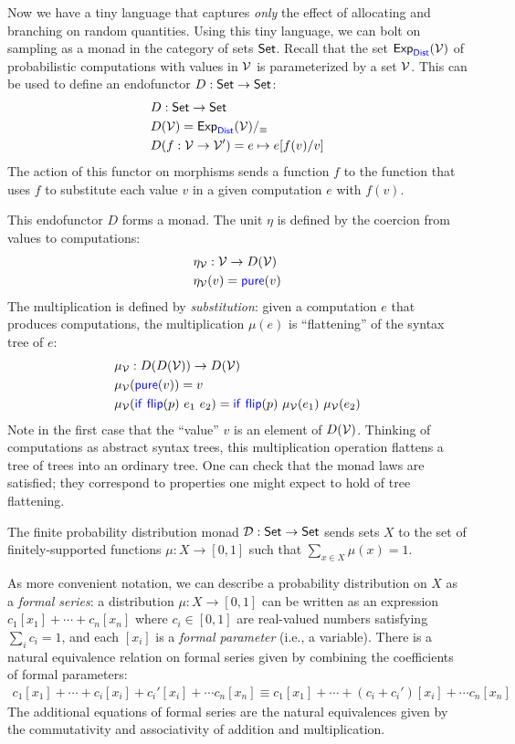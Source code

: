 Now we have a tiny language that captures \emph{only} the effect of allocating 
and branching on random quantities. Using this tiny language, we can bolt on sampling
as a monad in the category of sets $\mathsf{Set}$.
Recall that the set $\mathsf{Exp}_{\mathsf{{\color{blue}Dist}}}(\mathcal V)$ of probabilistic computations
with values in \(\mathcal V\) is parameterized by a set \(\mathcal V\).
This can be used to define an endofunctor \(D : \mathsf{Set} \to \mathsf{Set}\):
\begin{align*}
  &D : \mathsf{Set} \to \mathsf{Set} \\
  &D(\mathcal V) = \mathsf{Exp}_{\mathsf{{\color{blue}Dist}}}(\mathcal V) /_\equiv \\
  &D(f : \mathcal V \to \mathcal V') = e \mapsto e[f(v)/v]
\end{align*}
The action of this functor on morphisms sends a function \(f\)
to the function that uses \(f\) to substitute each value \(v\) in a given computation \(e\)
with \(f(v)\).

This endofunctor \(D\) forms a monad. The unit \(\eta\) is defined by
the coercion from values to computations:
\begin{align*}
  &\eta_{\mathcal V} : \mathcal V \to D(\mathcal V) \\
  &\eta_{\mathcal V}(v) = \mathsf{{\color{blue}pure}}(v)
\end{align*}
The multiplication is defined by \emph{substitution}:
given a computation \(e\) that produces computations,
the multiplication \(\mu(e)\) is ``flattening'' of the syntax tree of \(e\):
\begin{align*}
  &\mu_{\mathcal V} : D(D(\mathcal V)) \to D(\mathcal V) \\
  &\mu_{\mathcal V}(\mathsf{{\color{blue}pure}}(v)) = v \\
  &\mu_{\mathcal V}(\mathsf{{\color{blue}if}}~\mathsf{{\color{blue}flip}}{}(p)~{e_1}~{e_2}) = \mathsf{{\color{blue}if}}~\mathsf{{\color{blue}flip}}{}(p)~{\mu_{\mathcal V}(e_1)}~{\mu_{\mathcal V}(e_2)} \\
\end{align*}
Note in the first case that the ``value'' \(v\) is an element of \(D(\mathcal V)\).
Thinking of computations as abstract syntax trees, this multiplication operation
flattens a tree of trees into an ordinary tree.
One can check that the monad laws are satisfied;
they correspond to properties one might expect to hold of tree flattening.

The finite
probability distribution monad $\mathcal D : \mathsf{Set} \to \mathsf{Set}$ sends sets $X$ to 
the set of finitely-supported functions $\mu : X \to [0,1]$ such that 
$\sum_{x \in X} \mu(x) = 1$.

As more convenient notation, we can describe a probability distribution on 
$X$ as a \emph{formal series}: a distribution $\mu : X \to [0,1]$ 
can be written as an expression $c_1 [x_1] + \cdots + c_n [x_n]$ where 
$c_i \in [0,1]$ are real-valued numbers satisfying $\sum_i c_i = 1$, 
and each $[x_i]$ is a \emph{formal parameter} (i.e., a variable).
There is a natural equivalence relation on formal series given by 
combining the coefficients of formal parameters:
\begin{align*}
    c_1 [x_1] + \cdots + c_i [x_i] + c_i' [x_i] + \cdots c_n [x_n]
    \equiv
    c_1 [x_1] + \cdots + (c_i + c_i') [x_i] + \cdots c_n [x_n]
\end{align*}
The additional equations of formal series are the natural equivalences 
given by the commutativity and associativity of addition and multiplication.


